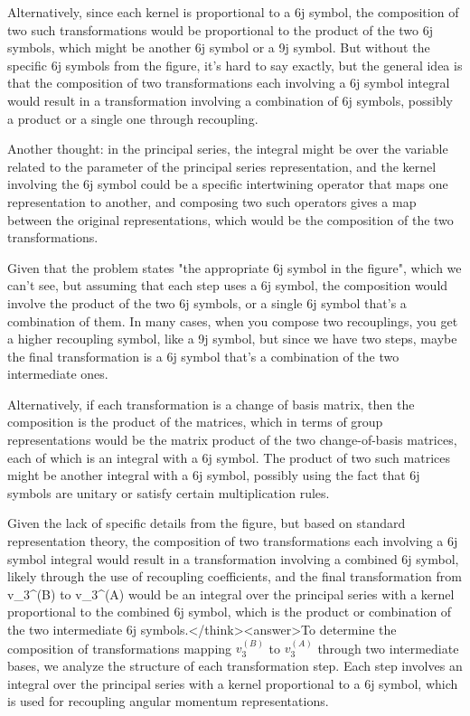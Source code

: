 Alternatively, since each kernel is proportional to a 6j symbol, the composition of two such transformations would be proportional to the product of the two 6j symbols, which might be another 6j symbol or a 9j symbol. But without the specific 6j symbols from the figure, it's hard to say exactly, but the general idea is that the composition of two transformations each involving a 6j symbol integral would result in a transformation involving a combination of 6j symbols, possibly a product or a single one through recoupling.

Another thought: in the principal series, the integral might be over the variable related to the parameter of the principal series representation, and the kernel involving the 6j symbol could be a specific intertwining operator that maps one representation to another, and composing two such operators gives a map between the original representations, which would be the composition of the two transformations.

Given that the problem states "the appropriate 6j symbol in the figure", which we can't see, but assuming that each step uses a 6j symbol, the composition would involve the product of the two 6j symbols, or a single 6j symbol that's a combination of them. In many cases, when you compose two recouplings, you get a higher recoupling symbol, like a 9j symbol, but since we have two steps, maybe the final transformation is a 6j symbol that's a combination of the two intermediate ones.

Alternatively, if each transformation is a change of basis matrix, then the composition is the product of the matrices, which in terms of group representations would be the matrix product of the two change-of-basis matrices, each of which is an integral with a 6j symbol. The product of two such matrices might be another integral with a 6j symbol, possibly using the fact that 6j symbols are unitary or satisfy certain multiplication rules.

Given the lack of specific details from the figure, but based on standard representation theory, the composition of two transformations each involving a 6j symbol integral would result in a transformation involving a combined 6j symbol, likely through the use of recoupling coefficients, and the final transformation from v_3^(B) to v_3^(A) would be an integral over the principal series with a kernel proportional to the combined 6j symbol, which is the product or combination of the two intermediate 6j symbols.</think><answer>To determine the composition of transformations mapping \( v_3^{(B)} \) to \( v_3^{(A)} \) through two intermediate bases, we analyze the structure of each transformation step. Each step involves an integral over the principal series with a kernel proportional to a 6j symbol, which is used for recoupling angular momentum representations.  

